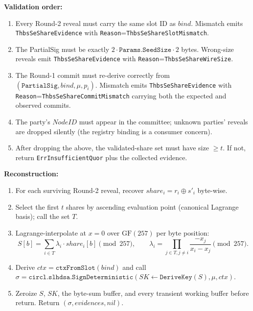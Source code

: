 \textbf{Validation order:}

\begin{enumerate}[leftmargin=2em,nosep]
  \item Every Round-2 reveal must carry the same slot ID as
        $\mathit{bind}$. Mismatch emits
        \texttt{ThbsSeShareEvidence} with
        \texttt{Reason}=\texttt{ThbsSeShareSlotMismatch}.
  \item The PartialSig must be exactly
        $2 \cdot \texttt{Params.SeedSize} \cdot 2$ bytes.
        Wrong-size reveals emit
        \texttt{ThbsSeShareEvidence} with
        \texttt{Reason}=\texttt{ThbsSeShareWireSize}.
  \item The Round-1 commit must re-derive correctly from
        $(\texttt{PartialSig}, \mathit{bind}, \mu, p_i)$.
        Mismatch emits
        \texttt{ThbsSeShareEvidence} with
        \texttt{Reason}=\texttt{ThbsSeShareCommitMismatch}
        carrying both the expected and observed commits.
  \item The party's $\mathit{NodeID}$ must appear in the
        committee; unknown parties' reveals are dropped silently
        (the registry binding is a consumer concern).
  \item After dropping the above, the validated-share set must
        have size $\ge t$. If not, return
        \texttt{ErrInsufficientQuor} plus the collected
        evidence.
\end{enumerate}

\textbf{Reconstruction:}

\begin{enumerate}[leftmargin=2em,nosep,start=6]
  \item For each surviving Round-2 reveal, recover
        $\mathit{share}_i = r_i \oplus s'_i$ byte-wise.
  \item Select the first $t$ shares by ascending evaluation
        point (canonical Lagrange basis); call the set $T$.
  \item Lagrange-interpolate at $x = 0$ over $\mathrm{GF}(257)$
        per byte position:
        \begin{equation*}
          S[b] = \sum_{i \in T}
            \lambda_i \cdot \mathit{share}_i[b]
            \pmod{257},
          \qquad \lambda_i = \prod_{j \in T, j \ne i}
            \frac{-x_j}{x_i - x_j} \pmod{257}.
        \end{equation*}
  \item Derive $\mathit{ctx} = \texttt{ctxFromSlot}(\mathit{bind})$
        and call
        $\sigma = \texttt{circl.slhdsa.SignDeterministic}(
        \mathit{SK} \gets \texttt{DeriveKey}(S), \mu,
        \mathit{ctx})$.
  \item Zeroize $S$, $\mathit{SK}$, the byte-sum buffer, and
        every transient working buffer before return. Return
        $(\sigma, \mathit{evidences}, \mathit{nil})$.
\end{enumerate}

